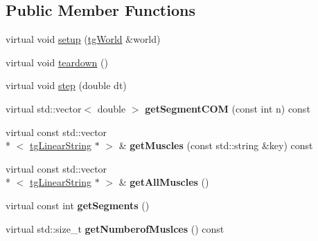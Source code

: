 \subsection*{Public Member Functions}
\begin{DoxyCompactItemize}
\item 
virtual void \hyperlink{class_base_spine_model_learning_a6d97d4097674fb9c7ea7f667e11442bb}{setup} (\hyperlink{classtg_world}{tg\-World} \&world)
\item 
virtual void \hyperlink{class_base_spine_model_learning_aa04ab240035720769a95c403c1f61f73}{teardown} ()
\item 
virtual void \hyperlink{class_base_spine_model_learning_abe197971d9b438aaaf36d2e8bddfc739}{step} (double dt)
\item 
\hypertarget{class_base_spine_model_learning_afd3d71b99a2105a60c78d52d67068c00}{virtual std\-::vector$<$ double $>$ {\bfseries get\-Segment\-C\-O\-M} (const int n) const }\label{class_base_spine_model_learning_afd3d71b99a2105a60c78d52d67068c00}

\item 
\hypertarget{class_base_spine_model_learning_a0c595346fb7a23e89d9f6ec572a19c49}{virtual const std\-::vector\\*
$<$ \hyperlink{classtg_linear_string}{tg\-Linear\-String} $\ast$ $>$ \& {\bfseries get\-Muscles} (const std\-::string \&key) const }\label{class_base_spine_model_learning_a0c595346fb7a23e89d9f6ec572a19c49}

\item 
\hypertarget{class_base_spine_model_learning_a508eae423b9fd9e194b620563b15b9db}{virtual const std\-::vector\\*
$<$ \hyperlink{classtg_linear_string}{tg\-Linear\-String} $\ast$ $>$ \& {\bfseries get\-All\-Muscles} ()}\label{class_base_spine_model_learning_a508eae423b9fd9e194b620563b15b9db}

\item 
\hypertarget{class_base_spine_model_learning_af38ddf518f0b9d524d869591216070fd}{virtual const int {\bfseries get\-Segments} ()}\label{class_base_spine_model_learning_af38ddf518f0b9d524d869591216070fd}

\item 
\hypertarget{class_base_spine_model_learning_a21c0b6e4c84e4f61b92d803dd677525f}{virtual std\-::size\-\_\-t {\bfseries get\-Numberof\-Muslces} () const }\label{class_base_spine_model_learning_a21c0b6e4c84e4f61b92d803dd677525f}


\end{DoxyCompactItemize}
